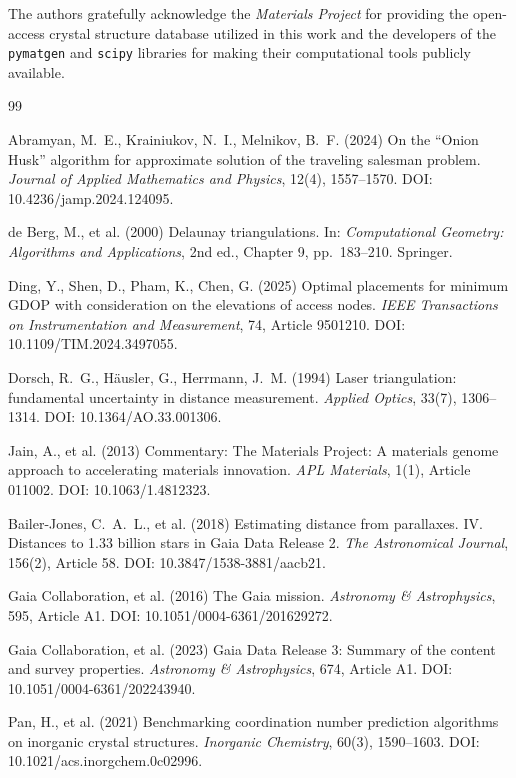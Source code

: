 \documentclass[11pt]{article}
\begin{document}
The authors gratefully acknowledge the \textit{Materials Project} for providing the open-access crystal structure database utilized in this work and the developers of the \texttt{pymatgen} and \texttt{scipy} libraries for making their computational tools publicly available. 


\begin{thebibliography}{99}

Abramyan, M.~E., Krainiukov, N.~I., Melnikov, B.~F. (2024)
On the ``Onion Husk'' algorithm for approximate solution of the
traveling salesman problem.
\emph{Journal of Applied Mathematics and Physics}, 12(4), 1557--1570.
DOI: 10.4236/jamp.2024.124095.

de Berg, M., et al. (2000)
Delaunay triangulations.
In: \emph{Computational Geometry: Algorithms and Applications},
2nd ed., Chapter 9, pp.~183--210.
Springer.

Ding, Y., Shen, D., Pham, K., Chen, G. (2025)
Optimal placements for minimum GDOP with consideration on the
elevations of access nodes.
\emph{IEEE Transactions on Instrumentation and Measurement}, 74,
Article 9501210.
DOI: 10.1109/TIM.2024.3497055.

Dorsch, R.~G., H{\"a}usler, G., Herrmann, J.~M. (1994)
Laser triangulation: fundamental uncertainty in distance measurement.
\emph{Applied Optics}, 33(7), 1306--1314.
DOI: 10.1364/AO.33.001306.

Jain, A., et al. (2013)
Commentary: The Materials Project: A materials genome approach to
accelerating materials innovation.
\emph{APL Materials}, 1(1), Article 011002.
DOI: 10.1063/1.4812323.

Bailer-Jones, C.~A.~L., et al. (2018)
Estimating distance from parallaxes. IV. Distances to 1.33 billion
stars in Gaia Data Release 2.
\emph{The Astronomical Journal}, 156(2), Article 58.
DOI: 10.3847/1538-3881/aacb21.

Gaia Collaboration, et al. (2016)
The Gaia mission.
\emph{Astronomy \& Astrophysics}, 595, Article A1.
DOI: 10.1051/0004-6361/201629272.

Gaia Collaboration, et al. (2023)
Gaia Data Release 3: Summary of the content and survey properties.
\emph{Astronomy \& Astrophysics}, 674, Article A1.
DOI: 10.1051/0004-6361/202243940.

Pan, H., et al. (2021)
Benchmarking coordination number prediction algorithms on inorganic
crystal structures.
\emph{Inorganic Chemistry}, 60(3), 1590--1603.
DOI: 10.1021/acs.inorgchem.0c02996.


\end{thebibliography}
\end{document}
